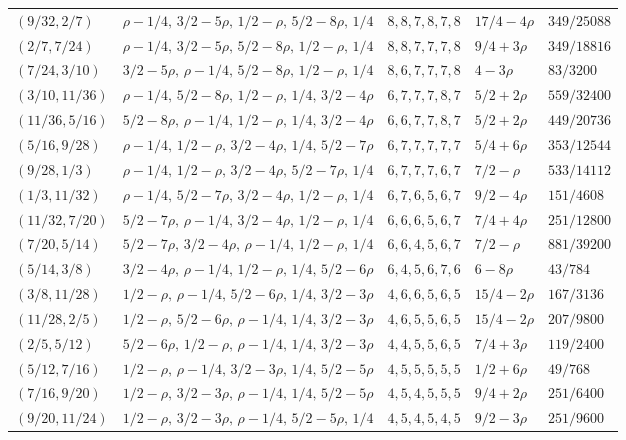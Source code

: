 \documentclass{amsart}
\numberwithin{equation}{section}
\numberwithin{table}{section}
\begin{document}
\begin{longtable}{@{}lllll@{}}
$(9/32,2/7)$ & $\rho-1/4,\,3/2-5\rho,\,1/2-\rho,\,5/2-8\rho,\,1/4$ & $8,8,7,8,7,8$ & $17/4-4\rho$ & $349/25088$\\
$(2/7,7/24)$ & $\rho-1/4,\,3/2-5\rho,\,5/2-8\rho,\,1/2-\rho,\,1/4$ & $8,8,7,7,7,8$ & $9/4+3\rho$ & $349/18816$\\
$(7/24,3/10)$ & $3/2-5\rho,\,\rho-1/4,\,5/2-8\rho,\,1/2-\rho,\,1/4$ & $8,6,7,7,7,8$ & $4-3\rho$ & $83/3200$\\
$(3/10,11/36)$ & $\rho-1/4,\,5/2-8\rho,\,1/2-\rho,\,1/4,\,3/2-4\rho$ & $6,7,7,7,8,7$ & $5/2+2\rho$ & $559/32400$\\
$(11/36,5/16)$ & $5/2-8\rho,\,\rho-1/4,\,1/2-\rho,\,1/4,\,3/2-4\rho$ & $6,6,7,7,8,7$ & $5/2+2\rho$ & $449/20736$\\
$(5/16,9/28)$ & $\rho-1/4,\,1/2-\rho,\,3/2-4\rho,\,1/4,\,5/2-7\rho$ & $6,7,7,7,7,7$ & $5/4+6\rho$ & $353/12544$\\
$(9/28,1/3)$ & $\rho-1/4,\,1/2-\rho,\,3/2-4\rho,\,5/2-7\rho,\,1/4$ & $6,7,7,7,6,7$ & $7/2-\rho$ & $533/14112$\\
$(1/3,11/32)$ & $\rho-1/4,\,5/2-7\rho,\,3/2-4\rho,\,1/2-\rho,\,1/4$ & $6,7,6,5,6,7$ & $9/2-4\rho$ & $151/4608$\\
$(11/32,7/20)$ & $5/2-7\rho,\,\rho-1/4,\,3/2-4\rho,\,1/2-\rho,\,1/4$ & $6,6,6,5,6,7$ & $7/4+4\rho$ & $251/12800$\\
$(7/20,5/14)$ & $5/2-7\rho,\,3/2-4\rho,\,\rho-1/4,\,1/2-\rho,\,1/4$ & $6,6,4,5,6,7$ & $7/2-\rho$ & $881/39200$\\
$(5/14,3/8)$ & $3/2-4\rho,\,\rho-1/4,\,1/2-\rho,\,1/4,\,5/2-6\rho$ & $6,4,5,6,7,6$ & $6-8\rho$ & $43/784$\\
$(3/8,11/28)$ & $1/2-\rho,\,\rho-1/4,\,5/2-6\rho,\,1/4,\,3/2-3\rho$ & $4,6,6,5,6,5$ & $15/4-2\rho$ & $167/3136$\\
$(11/28,2/5)$ & $1/2-\rho,\,5/2-6\rho,\,\rho-1/4,\,1/4,\,3/2-3\rho$ & $4,6,5,5,6,5$ & $15/4-2\rho$ & $207/9800$\\
$(2/5,5/12)$ & $5/2-6\rho,\,1/2-\rho,\,\rho-1/4,\,1/4,\,3/2-3\rho$ & $4,4,5,5,6,5$ & $7/4+3\rho$ & $119/2400$\\
$(5/12,7/16)$ & $1/2-\rho,\,\rho-1/4,\,3/2-3\rho,\,1/4,\,5/2-5\rho$ & $4,5,5,5,5,5$ & $1/2+6\rho$ & $49/768$\\
$(7/16,9/20)$ & $1/2-\rho,\,3/2-3\rho,\,\rho-1/4,\,1/4,\,5/2-5\rho$ & $4,5,4,5,5,5$ & $9/4+2\rho$ & $251/6400$\\
$(9/20,11/24)$ & $1/2-\rho,\,3/2-3\rho,\,\rho-1/4,\,5/2-5\rho,\,1/4$ & $4,5,4,5,4,5$ & $9/2-3\rho$ & $251/9600$\\

\end{longtable}
\end{document}
